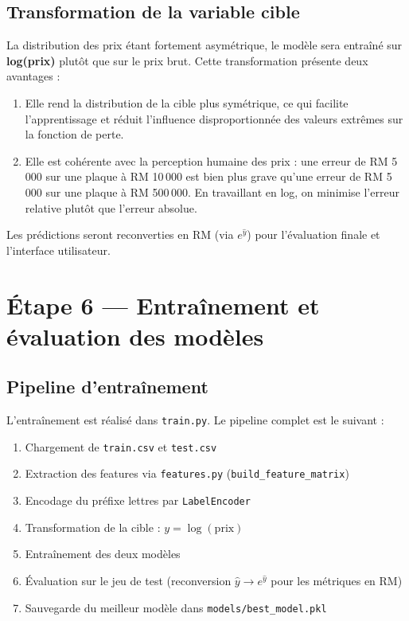 \documentclass[12pt, a4paper]{article}
\begin{document}
\subsection{Transformation de la variable cible}

La distribution des prix étant fortement asymétrique, le modèle sera entraîné sur \textbf{log(prix)} plutôt que sur le prix brut. Cette transformation présente deux avantages :

\begin{enumerate}
  \item Elle rend la distribution de la cible plus symétrique, ce qui facilite l'apprentissage et réduit l'influence disproportionnée des valeurs extrêmes sur la fonction de perte.
  \item Elle est cohérente avec la perception humaine des prix : une erreur de RM 5\,000 sur une plaque à RM 10\,000 est bien plus grave qu'une erreur de RM 5\,000 sur une plaque à RM 500\,000. En travaillant en log, on minimise l'erreur relative plutôt que l'erreur absolue.
\end{enumerate}

Les prédictions seront reconverties en RM (via $e^{\hat{y}}$) pour l'évaluation finale et l'interface utilisateur.

\section{Étape 6 — Entraînement et évaluation des modèles}
\label{sec:training}

\subsection{Pipeline d'entraînement}

L'entraînement est réalisé dans \texttt{train.py}. Le pipeline complet est le suivant :

\begin{enumerate}
  \item Chargement de \texttt{train.csv} et \texttt{test.csv}
  \item Extraction des features via \texttt{features.py} (\texttt{build\_feature\_matrix})
  \item Encodage du préfixe lettres par \texttt{LabelEncoder}
  \item Transformation de la cible : $y = \log(\text{prix})$
  \item Entraînement des deux modèles
  \item Évaluation sur le jeu de test (reconversion $\hat{y} \rightarrow e^{\hat{y}}$ pour les métriques en RM)
  \item Sauvegarde du meilleur modèle dans \texttt{models/best\_model.pkl}
\end{enumerate}
\end{document}
